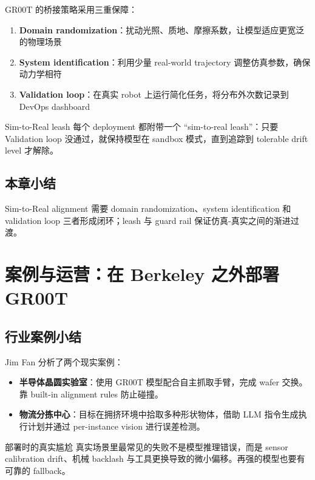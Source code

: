 \documentclass[a4paper]{article}
\begin{document}
GR00T 的桥接策略采用三重保障：

\begin{enumerate}
    \item \textbf{Domain randomization}：扰动光照、质地、摩擦系数，让模型适应更宽泛的物理场景
    \item \textbf{System identification}：利用少量 real-world trajectory 调整仿真参数，确保动力学相符
    \item \textbf{Validation loop}：在真实 robot 上运行简化任务，将分布外次数记录到 DevOps dashboard
\end{enumerate}

\begin{importantbox}{Sim-to-Real leash}
每个 deployment 都附带一个 ``sim-to-real leash''：只要 Validation loop 没通过，就保持模型在 sandbox 模式，直到追踪到 tolerable drift level 才解除。
\end{importantbox}

\subsection{本章小结}

Sim-to-Real alignment 需要 domain randomization、system identification 和 validation loop 三者形成闭环；leash 与 guard rail 保证仿真-真实之间的渐进过渡。

\section{案例与运营：在 Berkeley 之外部署 GR00T}

\subsection{行业案例小结}

Jim Fan 分析了两个现实案例：

\begin{itemize}
    \item \textbf{半导体晶圆实验室}：使用 GR00T 模型配合自主抓取手臂，完成 wafer 交换。靠 built-in alignment rules 防止碰撞。
    \item \textbf{物流分拣中心}：目标在拥挤环境中拾取多种形状物体，借助 LLM 指令生成执行计划并通过 per-instance vision 进行误差检测。
\end{itemize}

\begin{warningbox}{部署时的真实尴尬}
真实场景里最常见的失败不是模型推理错误，而是 sensor calibration drift、机械 backlash 与工具更换导致的微小偏移。再强的模型也要有可靠的 fallback。
\end{warningbox}
\end{document}

